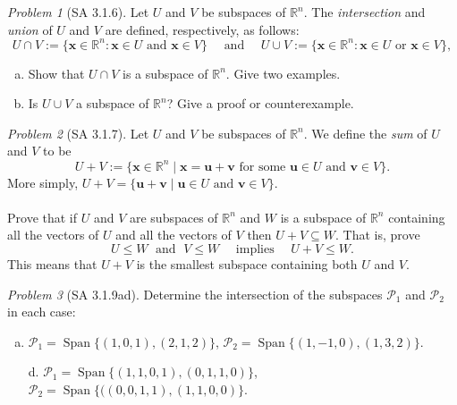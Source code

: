 \documentclass[fleqn,11pt]{paper}
\theoremstyle{remark}
\newtheorem{problem}{Problem}
\newtheorem*{solution}{{\bf Solution}}
\newcommand\R{\fld{R}}
\renewcommand{\vec}[1]{\mathbf{#1}}
\newcommand{\<}{\ensuremath{\langle}}
\renewcommand{\>}{\ensuremath{\rangle}}
\newcommand\fld[1]{\ensuremath{\mathbb{#1}}}
\newcommand\vu{\vec{u}}
\newcommand\vv{\vec{v}}
\newcommand\vx{\vec{x}}
\newcommand\Span{\ensuremath{\operatorname{Span}}}
\begin{document}
\begin{problem}[SA 3.1.6]
    Let $U$ and $V$ be subspaces of $\R^n$. 
    The \emph{intersection} and \emph{union} of $U$ and $V$ are defined, respectively, as follows:
    \[U \cap V := \{\vx \in \R^n : \vx \in U \text{ and } \vx \in V \}\quad \text{ and } \quad
    U \cup V := \{\vx \in \R^n : \vx \in U \text{ or } \vx \in V\},\]
  \begin{enumerate}[a.]
  \item Show that $U \cap V$ is a subspace of $\R^n$. Give two examples.
  \item Is $U \cup V$ a subspace of $\R^n$? Give a proof or counterexample.
  \end{enumerate}
\end{problem}
\newpage

\begin{problem}[SA 3.1.7]
Let $U$ and $V$ be subspaces of $\R^n$. We define the \emph{sum} of $U$ and $V$ 
to be
\[
U + V := \{\vx \in \R^n \mid \vx = \vu + \vv \text{ for some $\vu \in U$ and $\vv \in V$}\}.
\]
More simply, $U + V = \{\vu + \vv \mid \vu \in U \text{ and } \vv \in V\}$.\\
\\
Prove that if $U$ and $V$ are subspaces of $\R^n$ and $W$ is a subspace of 
$\R^n$ containing all the vectors of $U$ and all the vectors of $V$ 
then $U + V \subseteq W$. That is, prove
\[
U \leq W \; \text{ and } \; V \leq W \quad \text{ implies } \quad 
U + V \leq W.
\] 
This means that $U + V$ is the smallest subspace containing both $U$ and $V$.
\end{problem}
\newpage
\begin{problem}[SA 3.1.9ad] 
Determine the intersection of the subspaces $\mathcal{P}_1$ and $\mathcal{P}_2$ in each case:
  \begin{enumerate}[a.]
  \item $\mathcal{P}_1 =  \Span \{(1, 0, 1), (2, 1, 2)\}$, $\mathcal{P}_2= \Span\{(1, -1, 0), (1, 3, 2)\}$.
  \item[d.] $\mathcal{P}_1 =  \Span \{(1, 1, 0, 1), (0, 1, 1, 0)\}$,
    $\mathcal{P}_2= \Span\{((0, 0, 1, 1), (1, 1, 0, 0)\}$.
  \end{enumerate}
\end{problem}
\end{document}
